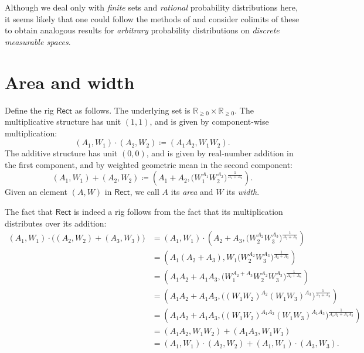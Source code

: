 \documentclass[11pt,fleqn]{article}
\renewcommand{\geq}{\geqslant}
\newcommand{\rig}[1]{\mathsf{#1}}
\newcommand{\Rect}{\rig{Rect}}
\begin{document}
\begin{remark}
  Although we deal only with \emph{finite} sets and \emph{rational} probability distributions here, it seems likely that one could follow the methods of \cite{FP2019} and consider colimits of these to obtain analogous results for \emph{arbitrary} probability distributions on \emph{discrete measurable spaces}.
\end{remark}



\section{Area and width}
\label{section:area-and-width}

\begin{definition}
\label{definition:rect}
  Define the rig $\Rect$ as follows.
  The underlying set is $\mathbb{R}_{\geq0}\times\mathbb{R}_{\geq0}$.
  The multiplicative structure has unit $(1,1)$, and is given by component-wise multiplication:
  \[
    (A_1,W_1)\cdot(A_2,W_2)\coloneqq(A_1A_2,W_1W_2).
  \]
  The additive structure has unit $(0,0)$, and is given by real-number addition in the first component, and by weighted geometric mean in the second component:
  \[
    (A_1,W_1) + (A_2,W_2)
    \coloneqq \left(
      A_1 + A_2,
      \big( W_1^{A_1} W_2^{A_2} \big)^{\frac{1}{A_1+A_2}}
    \right).
  \]
  Given an element $(A,W)$ in $\Rect$, we call $A$ its \emph{area} and $W$ its \emph{width}.
\end{definition}

The fact that $\Rect$ is indeed a rig follows from the fact that its multiplication distributes over its addition:
\[
  \begin{aligned}
    (A_1,W_1) \cdot \Big((A_2,W_2)+(A_3,W_3)\Big)
    &= (A_1,W_1) \cdot \left(
        A_2+A_3, \big(W_2^{A_2}W_3^{A_3}\big)^{\frac{1}{A_2+A_3}}
      \right)
  \\&= \left(
        A_1(A_2+A_3), W_1\big(W_2^{A_2}W_3^{A_3}\big)^{\frac{1}{A_2+A_3}}
      \right)
  \\&= \left(
        A_1A_2+A_1A_3, \big(W_1^{A_2+A_3}W_2^{A_2}W_3^{A_3}\big)^{\frac{1}{A_2+A_3}}
      \right)
  \\&= \left(
        A_1A_2+A_1A_3, \big((W_1W_2)^{A_2}(W_1W_3)^{A_3}\big)^{\frac{1}{A_2+A_3}}
      \right)
  \\&= \left(
        A_1A_2+A_1A_3, \big((W_1W_2)^{A_1A_2}(W_1W_3)^{A_1A_3}\big)^{\frac{1}{A_1A_2+A_1A_3}}
      \right)
  \\&= (A_1A_2,W_1W_2) + (A_1A_3,W_1W_3)
  \\&= (A_1,W_1)\cdot(A_2,W_2) + (A_1,W_1)\cdot(A_3,W_3).
  \end{aligned}
\]
\end{document}

